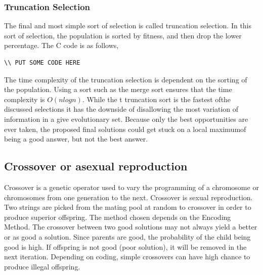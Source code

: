 \subsubsection{Truncation Selection}
The final and most simple sort of selection is called truncation selection. 
In this sort of selection, the population is sorted by fitness, and then drop the lower
percentage. The C code is as follows,
\begin{lstlisting}[language=C]
\\ PUT SOME CODE HERE
\end{lstlisting}
The time complexity of the truncation selection is dependent on the sorting of the population.
Using a sort such as the merge sort ensures that the time complexity is $O(nlogn)$.
While the t truncation sort is the fastest ofthe discussed selections it has the downside of
disallowing the most variation of information in a give evolutionary set. 
Because only the best opportunities are ever taken, the proposed final solutions could get stuck
on a local maximumof being a good answer, but not the best answer.

\subsection{Crossover or asexual reproduction}
Crossover is a genetic operator used to vary the programming of a chromosome or chromosomes
from one generation to the next.
Crossover is sexual reproduction. Two strings are picked from the mating pool at random to
crossover in order to produce superior offspring. The method chosen depends on the Encoding Method.
The crossover between two good solutions may not always yield a better or as good a solution.
Since parents are good, the probability of the child being good is high.
If offspring is not good (poor solution), it will be removed in the next iteration.
Depending on coding, simple crossovers can have high chance to produce illegal offspring.

